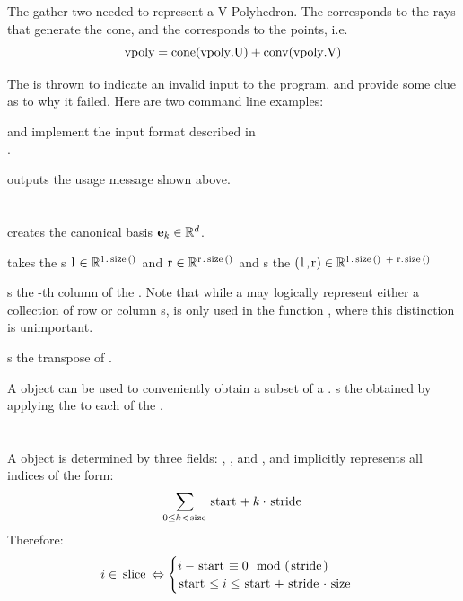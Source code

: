 The  gather two  needed to represent a V-Polyhedron.  The  corresponds to the rays that generate the cone, and the  corresponds to the points, i.e.
\[ \mli{vpoly} = \cone(\mli{vpoly.U}) + \conv(\mli{vpoly.V}) \]
\lstVPoly

The  is thrown to indicate an invalid input to the program, and provide some clue as to why it failed.  Here are two command line examples:

\lstinputerror

 and  implement the input format described in \\.
\lstissV
\lstossV

 outputs the usage message shown above.
\lstusage

\section{}
 creates the canonical basis  $\mathbf{e}_k \in \mathbb{R}^d$.
\lstek

 takes the s $\mli{l} \in \R^{\mli{l.size()}}$ and $\mli{r} \in \R^{\mli{r.size()}}$ and s the  $(\mli{l,r}) \in \R^{\mli{l.size() + r.size()}}$
\lstconcatenate

 s the -th column of the .  Note that while a  may logically represent either a collection of row or column s,  is only used in the function , where this distinction is unimportant.
\lstgetcolumn

 s the transpose of .
\lsttranspose

A  object can be used to conveniently obtain a subset of a .   s the  obtained by applying the  to each  of the .
\lstslicematrix

\section{}

A  object is determined by three fields: , , and , and implicitly represents all indices of the form:
\[ \sum_{0 \leq k < \mli{size}} \mli{start} + k\cdot\mli{stride} \]
Therefore:
\[i \in \mli{slice} \Leftrightarrow
	\begin{cases}
		i - \mli{start} \equiv 0 \mod(\mli{stride}) \\
		\mli{start} \leq i \leq \mli{start} + {\mli{stride}}\cdot\mli{size}
	\end{cases}\]
\lstindexinslice

